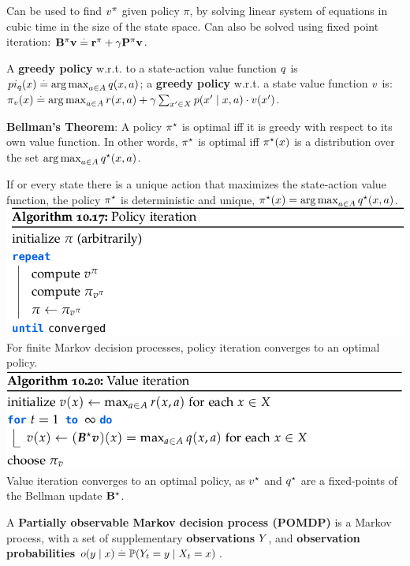 Can be used to find $\fnv[\pi]$ given policy $\pi$, by solving linear system of equations in cubic time in the size of the state space. Can also be solved using fixed point iteration: $\mathbf{B}^\pi \mathbf{v} \overset{.}{=} \mathbf{r}^\pi + \gamma \mathbf{P}^\pi \mathbf{v}$.
\begin{framed}
    A \textbf{greedy policy} w.r.t. to a state-action value function $\fnq$ is $pi_{\fnq}(x) \defeq \argmax_{a \in \sA} \q{x}{a}$; a \textbf{greedy policy} w.r.t. a state value function $\fnv$ is: $\pi_{\fnv}(x) \defeq \argmax_{a \in \sA} r(x, a) + \gamma \sum_{x' \in \sX} p(x' \mid x, a) \cdot \v{x'}$.
\end{framed}
\begin{framed}
    \textbf{Bellman's Theorem}: A policy $\pi^\star$ is optimal iff it is greedy with respect to its own value function. In other words, $\pi^\star$ is optimal iff $\pi^\star(x)$ is a distribution over the set $\argmax_{a \in \sA} \q*{x}{a}$.
\end{framed}
If or every state there is a unique action that maximizes the state-action value function, the policy $\pi^\star$ is deterministic and unique, $\pis(x) = \argmax_{a \in \sA} \q*{x}{a}$.
\includegraphics[width=\linewidth, trim={0 0 3cm 0}]{images/Policy_Iteration.png}
For finite Markov decision processes, policy iteration converges to an optimal policy.
\includegraphics[width=\linewidth, trim={0 0 3cm 0}]{images/Value_Iteration.png}
Value iteration converges to an optimal policy, as $\fnv[\star]$ and $\fnq[\star]$ are a fixed-points of the Bellman update $\mathbf{B^\star}$.
\begin{framed}
    A \textbf{Partially observable Markov decision process (POMDP)} is a Markov process, with a set of supplementary \textbf{observations} $Y$, and \textbf{observation probabilities} $o(y \mid x) \defeq \Pr{Y_t = y \mid X_t = x}$.
\end{framed}
